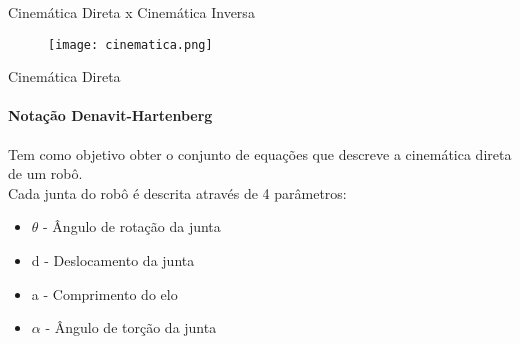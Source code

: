 \begin{frame}[c]{Cinemática Direta x Cinemática Inversa} 

    \begin{figure}
        \texttt{[image: cinematica.png]}
    \end{figure}
        
\end{frame}
\begin{frame}[c]{Cinemática Direta} 
    \framesubtitle{Notação Denavit-Hartenberg}
    Tem como objetivo obter o conjunto de equações que descreve a cinemática direta de um robô. \\
    Cada junta do robô é descrita através de 4 parâmetros:
    \begin{itemize}
        \item $\theta$ - Ângulo de rotação da junta
        \item d - Deslocamento da junta
        \item a - Comprimento do elo
        \item $\alpha$ - Ângulo de torção da junta
        
    \end{itemize}

\end{frame}

